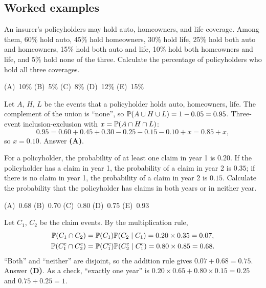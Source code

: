 \subsection{Worked examples}

\begin{example}
An insurer's policyholders may hold auto, homeowners, and life coverage. Among them, 60\% hold
auto, 45\% hold homeowners, 30\% hold life, 25\% hold both auto and homeowners, 15\% hold both auto
and life, 10\% hold both homeowners and life, and 5\% hold none of the three.
Calculate the percentage of policyholders who hold all three coverages.
\par\smallskip\noindent (A)~10\% \quad (B)~5\% \quad (C)~8\% \quad (D)~12\% \quad (E)~15\%
\end{example}
\begin{solution}
Let $A$, $H$, $L$ be the events that a policyholder holds auto, homeowners, life. The
complement of the union is ``none'', so $\mathbb{P}(A \cup H \cup L) = 1 - 0.05 = 0.95$. Three-event
inclusion-exclusion with $x = \mathbb{P}(A \cap H \cap L)$:
\[
0.95 = 0.60 + 0.45 + 0.30 - 0.25 - 0.15 - 0.10 + x = 0.85 + x,
\]
so $x = 0.10$. Answer \textbf{(A)}.
\end{solution}

\begin{example}
For a policyholder, the probability of at least one claim in year 1 is $0.20$. If the
policyholder has a claim in year 1, the probability of a claim in year 2 is $0.35$; if there is
no claim in year 1, the probability of a claim in year 2 is $0.15$.
Calculate the probability that the policyholder has claims in both years or in neither year.
\par\smallskip\noindent (A)~0.68 \quad (B)~0.70 \quad (C)~0.80 \quad (D)~0.75 \quad (E)~0.93
\end{example}
\begin{solution}
Let $C_1$, $C_2$ be the claim events. By the multiplication rule,
\begin{align*}
\mathbb{P}(C_1 \cap C_2) &= \mathbb{P}(C_1)\mathbb{P}(C_2 \mid C_1) = 0.20 \times 0.35 = 0.07,\\
\mathbb{P}(C_1^{\mathrm{c}} \cap C_2^{\mathrm{c}}) &= \mathbb{P}(C_1^{\mathrm{c}})\mathbb{P}(C_2^{\mathrm{c}} \mid C_1^{\mathrm{c}}) = 0.80 \times 0.85 = 0.68.
\end{align*}
``Both'' and ``neither'' are disjoint, so the addition rule gives $0.07 + 0.68 = 0.75$.
Answer \textbf{(D)}. As a check, ``exactly one year'' is $0.20 \times 0.65 + 0.80 \times 0.15 = 0.25$
and $0.75 + 0.25 = 1$.
\end{solution}

